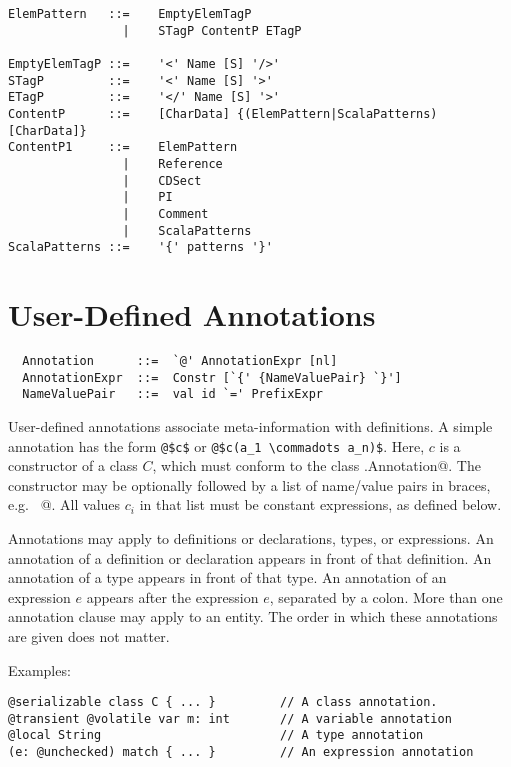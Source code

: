 {\syntax\begin{lstlisting}
ElemPattern   ::=    EmptyElemTagP
                |    STagP ContentP ETagP                                    

EmptyElemTagP ::=    '<' Name [S] '/>'
STagP         ::=    '<' Name [S] '>'                          
ETagP         ::=    '</' Name [S] '>'                                        
ContentP      ::=    [CharData] {(ElemPattern|ScalaPatterns) [CharData]}
ContentP1     ::=    ElemPattern
                |    Reference
                |    CDSect
                |    PI
                |    Comment
                |    ScalaPatterns
ScalaPatterns ::=    '{' patterns '}'
\end{lstlisting}


\chapter{User-Defined Annotations}
\label{sec:annotations}

\syntax\begin{lstlisting}
  Annotation      ::=  `@' AnnotationExpr [nl]
  AnnotationExpr  ::=  Constr [`{' {NameValuePair} `}']
  NameValuePair   ::=  val id `=' PrefixExpr
\end{lstlisting}

User-defined annotations associate meta-information with definitions.
A simple annotation has the form \lstinline^@$c$^ or
\lstinline^@$c(a_1 \commadots a_n)$^.  
Here, $c$ is a constructor of a class $C$, which must conform
to the class \lstinline@scala.Annotation@. 
The
constructor may be optionally followed by a list of name/value pairs
in braces, e.g.  ~@. All
values $c_i$ in that list must be constant expressions, as defined below.

Annotations may apply to definitions or declarations, types, or
expressions.  An annotation of a definition or declaration appears in
front of that definition.  An annotation of a type appears in front of
that type. An annotation of an expression $e$ appears after the
expression $e$, separated by a colon. More than one annotation clause
may apply to an entity. The order in which these annotations are given
does not matter.

Examples:
\begin{lstlisting}
@serializable class C { ... }         // A class annotation.
@transient @volatile var m: int       // A variable annotation
@local String                         // A type annotation
(e: @unchecked) match { ... }         // An expression annotation
\end{lstlisting}

}

